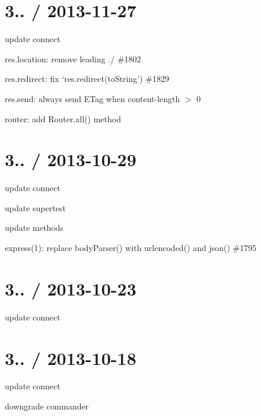 {\ttfamily \section*{3.. / 2013-\/11-\/27 }}

{\ttfamily }

{\ttfamily 
\begin{DoxyItemize}
\item update connect
\item res.\+location\+: remove leading ./ \#1802 
\item res.\+redirect\+: fix `res.\+redirect(\textquotesingle{}to\+String') \#1829 
\item res.\+send\+: always send E\+Tag when content-\/length $>$ 0
\item router\+: add Router.\+all() method
\end{DoxyItemize}}

{\ttfamily \section*{3.. / 2013-\/10-\/29 }}

{\ttfamily }

{\ttfamily 
\begin{DoxyItemize}
\item update connect
\item update supertest
\item update methods
\item express(1)\+: replace body\+Parser() with urlencoded() and json() \#1795 
\end{DoxyItemize}}

{\ttfamily \section*{3.. / 2013-\/10-\/23 }}

{\ttfamily }

{\ttfamily 
\begin{DoxyItemize}
\item update connect
\end{DoxyItemize}}

{\ttfamily \section*{3.. / 2013-\/10-\/18 }}

{\ttfamily }

{\ttfamily 
\begin{DoxyItemize}
\item update connect
\item downgrade commander
\end{DoxyItemize}}

